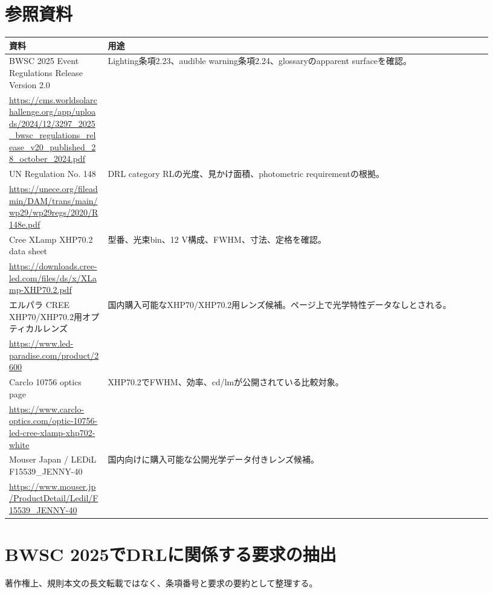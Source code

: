 \documentclass[11pt,a4paper]{article}
\begin{document}
\section{参照資料}
\begin{longtable}{p{0.19\linewidth}p{0.74\linewidth}}
\toprule
資料 & 用途 \\
\midrule
BWSC 2025 Event Regulations Release Version 2.0 & Lighting条項2.23、audible warning条項2.24、glossaryのapparent surfaceを確認。\\
\url{https://cms.worldsolarchallenge.org/app/uploads/2024/12/3297_2025_bwsc_regulations_release_v20_published_28_october_2024.pdf} & \\
\addlinespace
UN Regulation No. 148 & DRL category RLの光度、見かけ面積、photometric requirementの根拠。\\
\url{https://unece.org/fileadmin/DAM/trans/main/wp29/wp29regs/2020/R148e.pdf} & \\
\addlinespace
Cree XLamp XHP70.2 data sheet & 型番、光束bin、12 V構成、FWHM、寸法、定格を確認。\\
\url{https://downloads.cree-led.com/files/ds/x/XLamp-XHP70.2.pdf} & \\
\addlinespace
エルパラ CREE XHP70/XHP70.2用オプティカルレンズ & 国内購入可能なXHP70/XHP70.2用レンズ候補。ページ上で光学特性データなしとされる。\\
\url{https://www.led-paradise.com/product/2600} & \\
\addlinespace
Carclo 10756 optics page & XHP70.2でFWHM、効率、cd/lmが公開されている比較対象。\\
\url{https://www.carclo-optics.com/optic-10756-led-cree-xlamp-xhp702-white} & \\
\addlinespace
Mouser Japan / LEDiL F15539\_JENNY-40 & 国内向けに購入可能な公開光学データ付きレンズ候補。\\
\url{https://www.mouser.jp/ProductDetail/Ledil/F15539_JENNY-40} & \\
\bottomrule
\end{longtable}

\section{BWSC 2025でDRLに関係する要求の抽出}
著作権上、規則本文の長文転載ではなく、条項番号と要求の要約として整理する。
\end{document}

